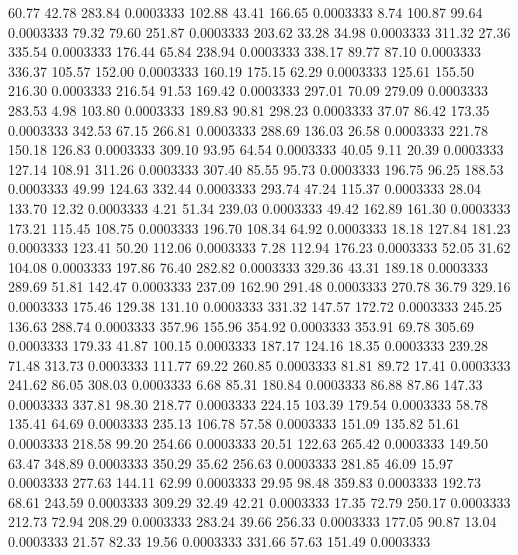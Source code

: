   60.77   42.78  283.84   0.0003333
 102.88   43.41  166.65   0.0003333
   8.74  100.87   99.64   0.0003333
  79.32   79.60  251.87   0.0003333
 203.62   33.28   34.98   0.0003333
 311.32   27.36  335.54   0.0003333
 176.44   65.84  238.94   0.0003333
 338.17   89.77   87.10   0.0003333
 336.37  105.57  152.00   0.0003333
 160.19  175.15   62.29   0.0003333
 125.61  155.50  216.30   0.0003333
 216.54   91.53  169.42   0.0003333
 297.01   70.09  279.09   0.0003333
 283.53    4.98  103.80   0.0003333
 189.83   90.81  298.23   0.0003333
  37.07   86.42  173.35   0.0003333
 342.53   67.15  266.81   0.0003333
 288.69  136.03   26.58   0.0003333
 221.78  150.18  126.83   0.0003333
 309.10   93.95   64.54   0.0003333
  40.05    9.11   20.39   0.0003333
 127.14  108.91  311.26   0.0003333
 307.40   85.55   95.73   0.0003333
 196.75   96.25  188.53   0.0003333
  49.99  124.63  332.44   0.0003333
 293.74   47.24  115.37   0.0003333
  28.04  133.70   12.32   0.0003333
   4.21   51.34  239.03   0.0003333
  49.42  162.89  161.30   0.0003333
 173.21  115.45  108.75   0.0003333
 196.70  108.34   64.92   0.0003333
  18.18  127.84  181.23   0.0003333
 123.41   50.20  112.06   0.0003333
   7.28  112.94  176.23   0.0003333
  52.05   31.62  104.08   0.0003333
 197.86   76.40  282.82   0.0003333
 329.36   43.31  189.18   0.0003333
 289.69   51.81  142.47   0.0003333
 237.09  162.90  291.48   0.0003333
 270.78   36.79  329.16   0.0003333
 175.46  129.38  131.10   0.0003333
 331.32  147.57  172.72   0.0003333
 245.25  136.63  288.74   0.0003333
 357.96  155.96  354.92   0.0003333
 353.91   69.78  305.69   0.0003333
 179.33   41.87  100.15   0.0003333
 187.17  124.16   18.35   0.0003333
 239.28   71.48  313.73   0.0003333
 111.77   69.22  260.85   0.0003333
  81.81   89.72   17.41   0.0003333
 241.62   86.05  308.03   0.0003333
   6.68   85.31  180.84   0.0003333
  86.88   87.86  147.33   0.0003333
 337.81   98.30  218.77   0.0003333
 224.15  103.39  179.54   0.0003333
  58.78  135.41   64.69   0.0003333
 235.13  106.78   57.58   0.0003333
 151.09  135.82   51.61   0.0003333
 218.58   99.20  254.66   0.0003333
  20.51  122.63  265.42   0.0003333
 149.50   63.47  348.89   0.0003333
 350.29   35.62  256.63   0.0003333
 281.85   46.09   15.97   0.0003333
 277.63  144.11   62.99   0.0003333
  29.95   98.48  359.83   0.0003333
 192.73   68.61  243.59   0.0003333
 309.29   32.49   42.21   0.0003333
  17.35   72.79  250.17   0.0003333
 212.73   72.94  208.29   0.0003333
 283.24   39.66  256.33   0.0003333
 177.05   90.87   13.04   0.0003333
  21.57   82.33   19.56   0.0003333
 331.66   57.63  151.49   0.0003333
